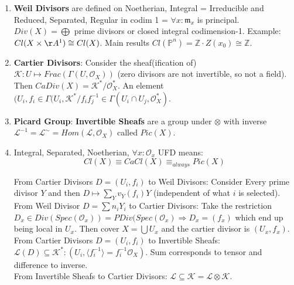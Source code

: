 \documentclass{article}
\newcommand{\Z}{\mathbb{Z}}
\newcommand{\PP}{\mathbb{P}}
\newcommand{\OO}{\mathcal{O}}
\newcommand{\mm}{\mathfrak{m}}
\newcommand{\Ra}{\Rightarrow}
\begin{document}
\begin{multicols}{2}
\begin{enumerate}
Deurings Thm: $E/L$ with CM by $O_K$ (1) If $K \subseteq L$, then $L(E/L,s) = L(s,\psi_{E/L})L(s,overline{\psi_{E/L}})$. (2) If $K \not \subseteq L$ and $L' = LK$, $L(E/L,s) = L(s, \psi_{E/L'})$. 

\subsection{Divisors}
\item \textbf{Weil Divisors} are defined on Noetherian, Integral = Irreducible and Reduced, Separated, Regular in codim 1 = $\forall x: \mm_x$ is principal. $Div(X) = \bigoplus$ prime divisors or closed integral codimension-1. Example: $Cl(X \times \AA^1) \cong Cl(X)$. Main results $Cl(\PP^n) = \Z\cdot Z(x_0) \cong \Z$.

\item \textbf{Cartier Divisors}: Consider the sheaf(ification of) $\mathcal{K}: U \mapsto Frac(\Gamma(U,\OO_X))$ (zero divisors are not invertible, so not a field). Then $CaDiv(X) = \mathcal{K}^*/\OO_X^*$.  An element $(U_i,f_i \in \Gamma(U_i,\mathcal{K}^*/ f_if_j^{-1} \in \Gamma(U_i \cap U_j,\OO_X^*)$. 

\item \textbf{Picard Group}: \textbf{Invertible Sheafs} are a group under $\otimes$ with inverse $\mathcal{L}^{-1} = \mathcal{L}^\sim = Hom(\mathcal{L},\OO_X)$ called $Pic(X)$.   


\item Integral, Separated, Noetherian, $\forall x: \OO_x$ UFD means:
\[Cl(X) \equiv CaCl(X) \equiv_{always} Pic(X)\]

From Cartier Divisors $D = (U_i,f_i)$ to Weil Divisors: Consider Every prime divisor $Y$ and then $D \mapsto \sum_Y v_Y(f_i)Y$ (independent of what $i$ is selected).\\

From Weil Divisor $D = \sum n_i Y_i$ to Cartier Divisors: Take the restriction $D_x \in Div(Spec(\OO_x)) = PDiv(Spec(\OO_x) \Ra D_x = (f_x)$ which end up being local in $U_x$. Then cover $X = \bigcup U_x$ and the cartier divisor is $(U_x,f_x)$. \\  

From Cartier Divisors $D = (U_i,f_i)$ to Invertible Sheafs: $\mathcal{L}(D) \subseteq \mathcal{K}^*: (U_i,\langle f_i^{-1}\rangle = f_i^{-1}\OO_X)$. Sum corresponds to tensor and difference to inverse.\\

From Invertible Sheafs to Cartier Divisors: $\mathcal{L} \subseteq \mathcal{K} = \mathcal{L} \otimes \mathcal{K}$.\\


\end{enumerate}
\end{multicols}
\end{document}
